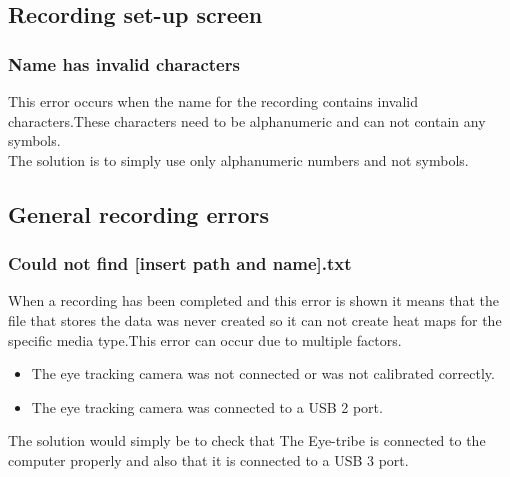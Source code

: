 \subsection{Recording set-up screen}
\subsubsection{Name has invalid characters}
This error occurs when the name for the recording contains invalid characters.These characters need to be alphanumeric and can not contain any symbols.\\
The solution is to simply use only alphanumeric numbers and not symbols.
\subsection{General recording errors}
\subsubsection{Could not find [insert path and name].txt}
When a recording has been completed and this error is shown it means that the file that stores the data was never created so it can not create heat maps for the specific media type.This error can occur due to multiple factors.\\
\begin{itemize}
\item The eye tracking camera was not connected or was not calibrated correctly.
\item The eye tracking camera was connected to a USB 2 port.
\end{itemize}
The solution would simply be to check that The Eye-tribe is connected to the computer properly and also that it is connected to a USB 3 port.
